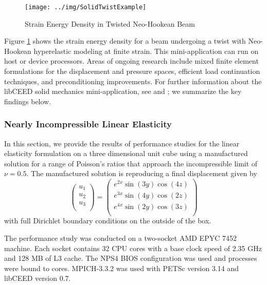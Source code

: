 \begin{figure}[ht!]
\texttt{[image: ../img/SolidTwistExample]}
\caption{Strain Energy Density in Twisted Neo-Hookean Beam}
\label{fig:solidtwist}
\end{figure}

Figure \ref{fig:solidtwist} shows the strain energy density for a beam undergoing a twist with Neo-Hookean hyperelastic modeling at finite strain.
This mini-application can run on host or device processors.
Areas of ongoing research include mixed finite element formulations for the displacement and pressure spaces, efficient load continuation techniques, and preconditioning improvements.
For further information about the libCEED solid mechanics mini-application, see \cite{imece2020} and \cite{mehraban2021simulating}; we summarize the key findings below.

\subsubsection{Nearly Incompressible Linear Elasticity}

In this section, we provide the results of performance studies for the linear elasticity formulation on a three dimensional unit cube using a manufactured solution for a range of Poisson's ratios that approach the incompressible limit of $\nu = 0.5$.
The manufactured solution is reproducing a final displacement given by
\begin{equation}
\begin{pmatrix}
u_1 \\
u_2 \\
u_3 \\
\end{pmatrix} =
\begin{pmatrix}
e^{2 x} \sin \left( 3 y \right) \cos \left( 4 z \right) \\
e^{3 x} \sin \left( 4 y \right) \cos \left( 2 z \right) \\
e^{4 x} \sin \left( 2 y \right) \cos \left( 3 z \right) \\
\end{pmatrix}
\end{equation}
with full Dirichlet boundary conditions on the outside of the box.

The performance study was conducted on a two-socket AMD EPYC 7452 machine.
Each socket contains 32 CPU cores with a base clock speed of 2.35 GHz and 128 MB of L3 cache.
The NPS4 BIOS configuration was used and processes were bound to cores.
MPICH-3.3.2 was used with PETSc \cite{petsc-user-ref} version 3.14 and libCEED \cite{libceed} version 0.7.

